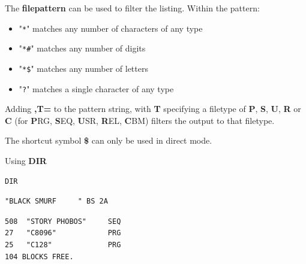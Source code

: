 \begin{description}[leftmargin=2cm,style=nextline]
                  The {\bf filepattern} can be used to filter the listing. Within the pattern:
                  \begin{itemize}
                     \item "\texttt{*}" matches any number of characters of any type
                     \item "\texttt{*\#}" matches any number of digits
                     \item "\texttt{*\$}" matches any number of letters
                     \item "\texttt{?}" matches a single character of any type
                  \end{itemize}

                  Adding {\bf ,T=} to the pattern string, with {\bf T} specifying a filetype of {\bf P}, {\bf S}, {\bf U}, {\bf R} or {\bf C} (for {\bf P}RG, {\bf S}EQ, {\bf U}SR, {\bf R}EL, {\bf C}BM) filters the output to that filetype.

                  The shortcut symbol {\bf \$} can only be used in direct mode.

\item [Example:]  Using {\bf DIR}

\begin{tcolorbox}[colback=black,coltext=white]
\verbatimfont{\codefont}
\begin{verbatim}
DIR
\end{verbatim}

\selectfont{\codefont 0}
\begin{tcolorbox}[colback=white,coltext=black,arc=0mm,boxrule=0mm,
       left*=0.5mm,right*=0mm,top=0mm,bottom=0mm,nobeforeafter,
       left skip=0.5mm,
       width=28mm,height=3mm,valign=center]
\begin{verbatim}
"BLACK SMURF     " BS 2A
\end{verbatim}
\end{tcolorbox}
\begin{verbatim}
508  "STORY PHOBOS"     SEQ
27   "C8096"            PRG
25   "C128"             PRG
104 BLOCKS FREE.
\end{verbatim}
\end{tcolorbox}
\end{description}


\newpage
